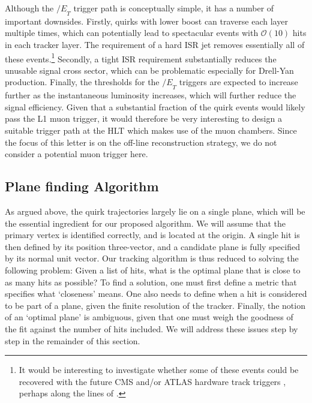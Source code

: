 \documentclass[10pt,aps,prd,nofootinbib,superscriptaddress,twocolumn,preprintnumbers,balancelastpage]{revtex4}
\newcommand{\MET}{{\slash\!\!\!\!E}_{T}}
\begin{document}
Although the $\MET$ trigger path is conceptually simple, it has a number of important downsides. Firstly, quirks with lower boost can traverse each layer multiple times, which can potentially lead to spectacular events with $\mathcal{O}(10)$ hits in each tracker layer. The requirement of a hard ISR jet removes essentially all of these events.\footnote{It would be interesting to investigate whether some of these events could be recovered with the future CMS and/or ATLAS hardware track triggers \cite{Shochet:1552953,Contardo:2020886}, perhaps along the lines of \cite{Gershtein:2017tsv}.} Secondly, a tight ISR requirement substantially reduces the unusable signal cross sector, which can be problematic especially for Drell-Yan production. Finally, the thresholds for the $\MET$ triggers are expected to increase further as the instantaneous luminosity increases, which will further reduce the signal efficiency. Given that a substantial fraction of the quirk events would likely pass the L1 muon trigger, it would therefore be very interesting to design a suitable trigger path at the HLT which makes use of the muon chambers. Since the focus of this letter is on the off-line reconstruction strategy, we do not consider a potential muon trigger here. 

\subsection{Plane finding Algorithm}
\label{sec:algorithm}
As argued above, the quirk trajectories largely lie on a single plane, which will be the essential ingredient for our proposed algorithm. We will assume that the primary vertex is identified correctly, and is located at the origin. A single hit is then defined by its position three-vector, and a candidate plane is fully specified by its normal unit vector. Our tracking algorithm is thus reduced to solving the following problem: Given a list of hits,  what is the optimal plane that is close to as many hits as possible? To find a solution, one must first define a metric that specifies what `closeness' means. One also needs to define when a hit is considered to be part of a plane, given the finite resolution of the tracker. Finally,  the notion of an `optimal plane' is ambiguous, given that one must weigh the goodness of the fit against the number of hits included.  We will address these issues step by step in the remainder of this section.

\end{document}
